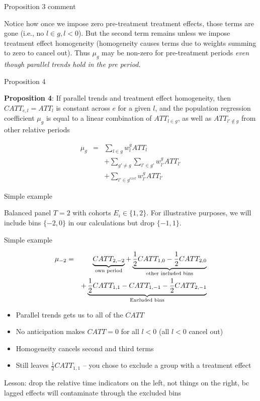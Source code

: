 \documentclass{beamer}
\begin{document}
\begin{frame}{Proposition 3 comment}

Notice how once we impose zero pre-treatment treatment effects, those terms are gone (i.e., no $l \in g, l<0$).  But the second term remains unless we impose treatment effect homogeneity (homogeneity causes terms due to weights summing to zero to cancel out). Thus $\mu_g$ may be non-zero for pre-treatment periods \emph{even though parallel trends hold in the pre period.}

\end{frame}

\begin{frame}{Proposition 4}

\textbf{Proposition 4}: If parallel trends and treatment effect homogeneity, then $CATT_{e,l}=ATT_l$ is constant across $e$ for a given $l$, and the population regression coefficient $\mu_g$ is equal to a linear combination of $ATT_{l \in g}$, as well as $ATT_{l' \notin g}$ from other relative periods

\begin{eqnarray*}
\mu_g &=& \sum_{l \in g} w^g_l ATT_l \\
&&+ \sum_{g' \neq g} \sum_{l' \in g'} w^g_{l'} ATT_{l'} \\
&&+ \sum_{l' \in g^{excl}} w^g_{l'}ATT_{l'}
\end{eqnarray*}


\end{frame}

\begin{frame}{Simple example}


Balanced panel $T=2$ with cohorts $E_i \in \{1,2 \}$. For illustrative purposes, we will include bins $\{-2,0\}$ in our calculations but drop $\{-1,1\}$. 


\end{frame}

\begin{frame}{Simple example}

\begin{eqnarray*}
\mu_{-2} &=& \underbrace{CATT_{2,-2}}_{\mathclap{\text{own period}}} + \underbrace{\frac{1}{2}CATT_{1,0} - \frac{1}{2} CATT_{2,0}}_{\mathclap{\text{other included bins}}} \\
&&+ \underbrace{ \frac{1}{2} CATT_{1,1} - CATT_{1,-1} - \frac{1}{2} CATT_{2,-1} }_{\mathclap{\text{Excluded bins}}}
\end{eqnarray*}

\begin{itemize}
\item Parallel trends gets us to all of the $CATT$
\item No anticipation makes $CATT=0$ for all $l<0$ (all $l<0$ cancel out)
\item Homogeneity cancels second and third terms
\item Still leaves $\frac{1}{2} CATT_{1,1}$ -- you chose  to exclude a group with a treatment effect
\end{itemize}Lesson: drop the relative time indicators on the left, not things on the right, bc lagged effects will contaminate through the excluded bins


\end{frame}
\end{document}

